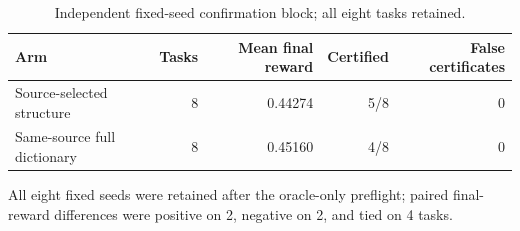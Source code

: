 \begin{table}[t]
\centering
\caption{Independent fixed-seed confirmation block; all eight tasks retained.}
\begin{tabular}{lrrrr}
\toprule
Arm & Tasks & Mean final reward & Certified & False certificates\\
\midrule
Source-selected structure & 8 & 0.44274 & 5/8 & 0\\
Same-source full dictionary & 8 & 0.45160 & 4/8 & 0\\
\bottomrule
\end{tabular}
\end{table}
\par\smallskip
All eight fixed seeds were retained after the oracle-only preflight; paired
final-reward differences were positive on 2, negative on 2, and tied on 4 tasks.
